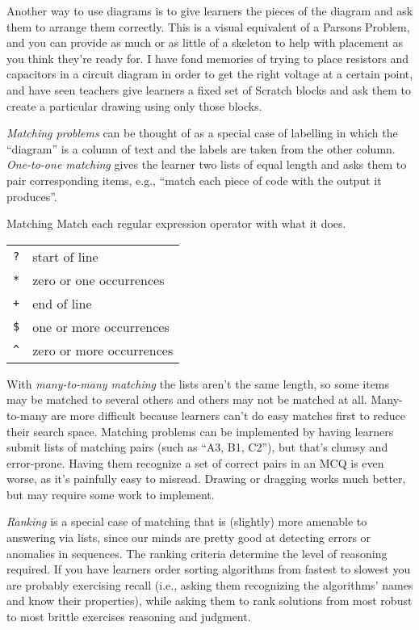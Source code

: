 
Another way to use diagrams is
to give learners the pieces of the diagram and ask them to arrange them correctly.
This is a visual equivalent of a Parsons Problem,
and you can provide as much or as little of a skeleton to help with placement
as you think they're ready for.
I have fond memories of trying to place resistors and capacitors in a circuit diagram
in order to get the right voltage at a certain point,
and have seen teachers give learners a fixed set of Scratch blocks
and ask them to create a particular drawing using only those blocks.

\emph{Matching problems} can be thought of as a special case of labelling
in which the ``diagram'' is a column of text
and the labels are taken from the other column.
\emph{One-to-one matching} gives the learner two lists of equal length
and asks them to pair corresponding items,
e.g., ``match each piece of code with the output it produces''.

\begin{aside}{Matching}
  Match each regular expression operator with what it does.

  \begin{longtable}[]{@{}ll@{}}
    \texttt{?} & start of line\\
    \texttt{*} & zero or one occurrences\\
    \texttt{+} & end of line\\
    \texttt{\$} & one or more occurrences\\
    \texttt{\^{}} & zero or more occurrences\\
  \end{longtable}
\end{aside}

With \emph{many-to-many matching} the lists aren't the same length,
so some items may be matched to several others
and others may not be matched at all.
Many-to-many are more difficult
because learners can't do easy matches first to reduce their search space.
Matching problems can be implemented by having learners submit lists of matching pairs
(such as ``A3, B1, C2''),
but that's clumsy and error-prone.
Having them recognize a set of correct pairs in an MCQ is even worse,
as it's painfully easy to misread.
Drawing or dragging works much better,
but may require some work to implement.

\emph{Ranking} is a special case of matching
that is (slightly) more amenable to answering via lists,
since our minds are pretty good at detecting errors or anomalies in sequences.
The ranking criteria determine the level of reasoning required.
If you have learners order sorting algorithms from fastest to slowest
you are probably exercising recall
(i.e., asking them recognizing the algorithms' names and know their properties),
while asking them to rank solutions from most robust to most brittle
exercises reasoning and judgment.

